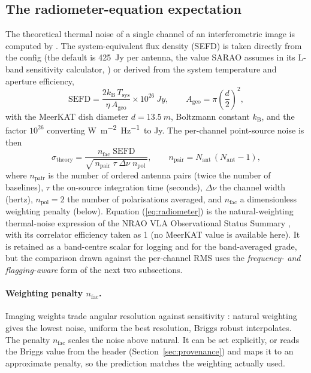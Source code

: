 \documentclass[11pt,a4paper]{article}
\begin{document}
\subsection{The radiometer-equation expectation}\label{sec:radiometer}
The theoretical thermal noise of a single channel of an interferometric image
\citep{tms2017,nraooss} is computed by . The
system-equivalent flux density (SEFD) is taken directly from the config (the default is
\SI{425}{Jy} per antenna, the value SARAO assumes in its L-band sensitivity calculator,
\citealp{saraosens}) or derived from the system temperature and aperture efficiency,
\begin{equation}
  \mathrm{SEFD} = \frac{2 k_{\mathrm B}\,T_{\mathrm{sys}}}{\eta\,A_{\mathrm{geo}}}\times 10^{26}\ \si{Jy},
  \qquad
  A_{\mathrm{geo}} = \pi\!\left(\frac{d}{2}\right)^{\!2},
  \label{eq:sefd}
\end{equation}
with the MeerKAT dish diameter $d = \SI{13.5}{m}$, Boltzmann constant
$k_{\mathrm B}$, and the factor $10^{26}$ converting
\si{W.m^{-2}.Hz^{-1}}\ to \si{Jy}. The per-channel point-source noise is then
\begin{equation}
  \sigma_{\mathrm{theory}} =
  \frac{n_{\mathrm{fac}}\;\mathrm{SEFD}}
       {\sqrt{\,n_{\mathrm{pair}}\;\tau\;\Delta\nu\;n_{\mathrm{pol}}\,}},
  \qquad
  n_{\mathrm{pair}} = N_{\mathrm{ant}}\,(N_{\mathrm{ant}}-1),
  \label{eq:radiometer}
\end{equation}
where $n_{\mathrm{pair}}$ is the number of ordered antenna pairs (twice the number of
baselines), $\tau$ the on-source
integration time (seconds), $\Delta\nu$ the channel width (hertz),
$n_{\mathrm{pol}} = 2$ the number of polarisations averaged, and
$n_{\mathrm{fac}}$ a dimensionless weighting penalty (below). Equation
(\ref{eq:radiometer}) is the natural-weighting thermal-noise expression of the
NRAO VLA Observational Status Summary \citep{nraooss}, with its correlator efficiency
taken as 1 (no MeerKAT value is available here). It is
retained as a band-centre scalar for logging and for the band-averaged grade,
but the comparison drawn against the per-channel RMS uses the
\emph{frequency- and flagging-aware} form of the next two subsections.

\paragraph{Weighting penalty $n_{\mathrm{fac}}$.} Imaging weights trade angular
resolution against sensitivity \citep{briggs1995}: natural weighting gives the
lowest noise, uniform the best resolution, Briggs robust interpolates. The
penalty $n_{\mathrm{fac}}$ scales the noise above natural. It can be set
explicitly, or  reads the Briggs  value from the
header (Section~\ref{sec:provenance}) and maps it to an approximate penalty, so
the prediction matches the weighting actually used.
\end{document}

